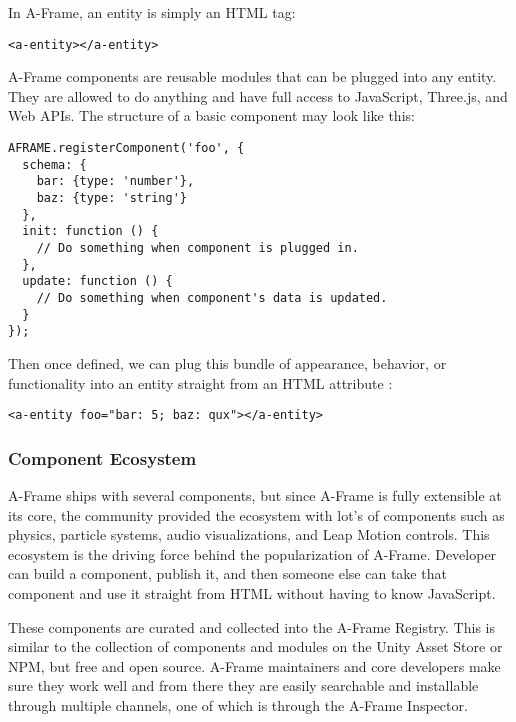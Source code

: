 In A-Frame, an entity is simply an HTML tag:

\begin{lstlisting}[frame=single]
<a-entity></a-entity>
\end{lstlisting}

A-Frame components are reusable modules that can be plugged into any entity. They are allowed to do anything and have full access to JavaScript, Three.js, and Web APIs. The structure of a basic component may look like this:

\begin{lstlisting}[frame=single]
AFRAME.registerComponent('foo', {
  schema: {
    bar: {type: 'number'},
    baz: {type: 'string'}
  },
  init: function () {
    // Do something when component is plugged in.
  },
  update: function () {
    // Do something when component's data is updated.
  }
});
\end{lstlisting}

Then once defined, we can plug this bundle of appearance, behavior, or functionality into an entity straight from an HTML attribute \cite{aframe-intro} :

\begin{lstlisting}[frame=single]
<a-entity foo="bar: 5; baz: qux"></a-entity>
\end{lstlisting}

\subsubsection{Component Ecosystem}
A-Frame ships with several components, but since A-Frame is fully extensible at its core, the community provided the ecosystem with lot's of components such as physics, particle systems, audio visualizations, and Leap Motion controls. This ecosystem is the driving force behind the popularization of A-Frame. Developer can build a component, publish it, and then someone else can take that component and use it straight from HTML without having to know JavaScript. \cite{aframe-intro}

These components are curated and collected into the A-Frame Registry. This is similar to the collection of components and modules on the Unity Asset Store or NPM, but free and open source. A-Frame maintainers and core developers make sure they work well and from there they are easily searchable and installable through multiple channels, one of which is through the A-Frame Inspector. \cite{aframe-intro}

